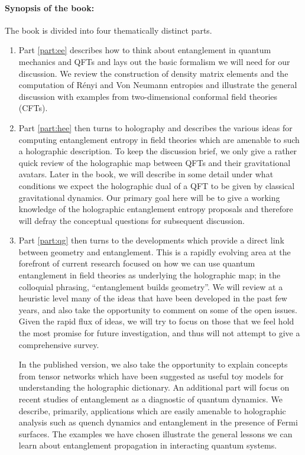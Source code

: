 \documentclass[12pt,openany]{book}
\begin{document}
\paragraph{Synopsis of the book:} The book is divided into four thematically distinct parts.
\begin{enumerate}
\item Part \ref{part:ee} describes how to think about entanglement in quantum mechanics and QFTs and lays out the basic formalism we will need  for our discussion. We review the construction of density matrix elements and the computation of R\'enyi and Von Neumann entropies and illustrate the general discussion with examples from two-dimensional conformal field theories (CFTs).
\item Part \ref{part:hee} then turns to holography and describes the various ideas for computing entanglement entropy in field theories which are amenable to such a holographic description. To keep the discussion brief, we only give a rather quick review of the holographic map between QFTs and their gravitational avatars. Later in the book,  we will describe in some detail under what conditions we expect the holographic dual of a QFT to be given by classical gravitational dynamics. Our primary goal here will be to give a working knowledge of the holographic entanglement entropy proposals and therefore will defray the conceptual questions for subsequent discussion.
\item Part \ref{part:qg} then turns to the developments which provide a direct link between geometry and entanglement. This is a rapidly evolving area at the forefront of current research focused on how we can use quantum entanglement in field theories as underlying the holographic map; in the colloquial phrasing, ``entanglement builds geometry''. We will review at a heuristic level many of the ideas that have been developed in the past few years, and also take the opportunity to comment on some of the open issues. Given the rapid flux of ideas, we will try to focus on those that we feel hold the most promise for future investigation, and thus will not attempt to give a comprehensive survey. 

In the published version, we also take the opportunity to explain concepts from tensor networks which have been suggested as useful toy models for understanding the holographic dictionary. An additional part will focus on recent studies of entanglement as a diagnostic of quantum dynamics.  We describe, primarily, applications which are easily amenable to holographic analysis such as quench dynamics and entanglement in the presence of Fermi surfaces. The examples we have chosen illustrate the general lessons we can learn about entanglement propagation in interacting quantum systems. 
\end{enumerate}
\end{document}
